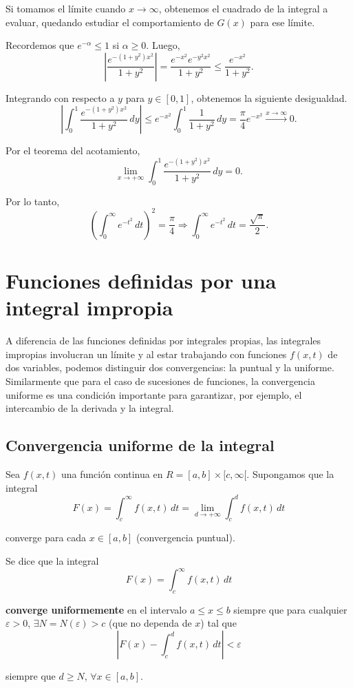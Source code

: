 \begin{ejemplo}
    Si tomamos el límite cuando $x \to \infty$, obtenemos el cuadrado de la integral a evaluar, quedando estudiar el comportamiento de $G(x)$ para ese límite. 

    Recordemos que $e^{-\alpha}  \leq 1$ si $\alpha \geq 0$. Luego,
    $$\left|\frac{e^{-(1+y^2)x^2}}{1+y^2}\right| = \frac{e^{-x^2} e^{-y^2 x^2}}{1+y^2} \leq \frac{e^{-x^2}}{1+y^2}.$$

    Integrando con respecto a $y$ para $y \in [0,1]$, obtenemos la siguiente desigualdad.
    $$\left|\int_0^1 \frac{e^{-(1+y^2)x^2}}{1+y^2}  \,dy\right| \leq e^{-x^2} \int_0^1 \frac{1}{1+y^2} \,dy = \frac{\pi}{4} e^{-x^2} \overset{x \to \infty}{\longrightarrow} 0.$$

    Por el teorema del acotamiento, 
    $$\lim_{x \to + \infty} \int_0^1 \frac{e^{-(1+y^2)x^2}}{1+y^2}  \,dy = 0.$$

    Por lo tanto,
    $$\left(\int_0^{\infty} e^{-t^2} \,dt\right)^2 = \frac{\pi}{4} \Rightarrow \int_0^{\infty} e^{-t^2} \,dt = \frac{\sqrt{\pi}}{2}.$$
\end{ejemplo}


\section{Funciones definidas por una integral impropia}

A diferencia de las funciones definidas por integrales propias, las integrales impropias involucran un límite y al estar trabajando con funciones $f(x,t)$ de dos variables, podemos distinguir dos convergencias: la puntual y la uniforme. Similarmente que para el caso de sucesiones de funciones, la convergencia uniforme es una condición importante para garantizar, por ejemplo, el intercambio de la derivada y la integral.

\subsection{Convergencia uniforme de la integral}

\begin{defi}
    Sea $f(x,t)$ una función continua en $R = [a,b] \times [c, \infty[$. Supongamos que la integral
    $$F(x) = \int_c^{\infty} f(x,t) \,dt = \lim_{d\to + \infty} \int_c^d f(x,t) \,dt$$

    converge para cada $x \in [a,b]$ (convergencia puntual). 
    
    Se dice que la integral 
    $$F(x) = \int_c^{\infty} f(x,t) \,dt$$

    \textbf{converge uniformemente} en el intervalo $a \leq x \leq b$ siempre que para cualquier $\varepsilon > 0$, $\exists N = N(\varepsilon) > c$ (que no dependa de $x$) tal que
    $$\left| F(x) - \int_c^d f(x,t) \,dt \right| < \varepsilon$$

    siempre que $d \geq N$, $\forall x \in [a,b]$.
\end{defi}

